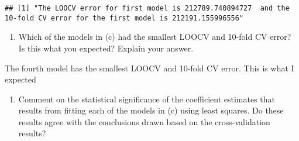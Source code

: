 \documentclass[]{article}
\providecommand{\tightlist}{%
  \setlength{\itemsep}{0pt}\setlength{\parskip}{0pt}}
\begin{document}
\begin{verbatim}
## [1] "The LOOCV error for first model is 212789.740894727  and the 10-fold CV error for the first model is 212191.155996556"
\end{verbatim}

\begin{enumerate}
\def\labelenumi{(\alph{enumi})}
\setcounter{enumi}{4}
\tightlist
\item
  Which of the models in (c) had the smallest LOOCV and 10-fold CV
  error? Is this what you expected? Explain your answer.
\end{enumerate}

The fourth model has the smallest LOOCV and 10-fold CV error. This is
what I expected

\begin{enumerate}
\def\labelenumi{(\alph{enumi})}
\setcounter{enumi}{5}
\tightlist
\item
  Comment on the statistical significance of the coefficient estimates
  that results from fitting each of the models in (c) using least
  squares. Do these results agree with the conclusions drawn based on
  the cross-validation results?
\end{enumerate}
\end{document}

